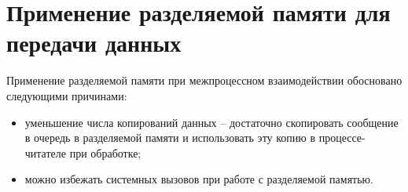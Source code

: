 %
%
%
%
%
%
%
\section{Применение разделяемой памяти для передачи данных}\label{chapter31:SharedMemoryOptimization}

Применение разделяемой памяти при межпроцессном взаимодействии обосновано следующими причинами:
\begin{itemize}
\item уменьшение числа копирований данных -- достаточно скопировать сообщение в очередь в разделяемой памяти и использовать эту копию в процессе-читателе при обработке;
\item можно избежать системных вызовов при работе с разделяемой памятью.
\end{itemize}

